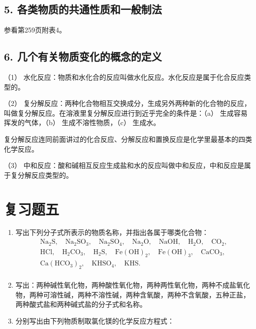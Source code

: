 \subsection{5. 各类物质的共通性质和一般制法}

参看第259页附表4。

\subsection{6. 几个有关物质变化的概念的定义}

（1）
水化反应：物质和水化合的反应叫做水化反应。水化反应是属于化合反应类型的。

（2）
复分解反应：两种化合物相互交换成分，生成另外两种新的化合物的反应，叫做复分解反应。在溶液里复分解反应进行到近乎完全的条件是：（a）
生成容易挥发的气体，（b） 生成不溶性物质，（c） 生成水。

复分解反应连同前面讲过的化合反应、分解反应和置换反应是化学里最基本的四类化学反应。

（3）
中和反应：酸和碱相互反应生成盐和水的反应叫做中和反应，中和反应是属于复分解反应类型的。

\section{复习题五}

\begin{enumerate}
\item
  写出下列分子式所表示的物质名称，并指出各属于哪类化合物：
\[
\begin{array}{l} \mathrm{Na}_{2} \mathrm{S}, \quad \mathrm{Na}_{2} \mathrm{SO}_{3}, \quad \mathrm{Na}_{2} \mathrm{SO}_{4}, \quad \mathrm{Na}_{2} \mathrm{O}, \quad \mathrm{NaOH}, \quad \mathrm{H}_{2} \mathrm{O}, \quad \mathrm{CO}_{2}, \\ \mathrm{HCl}, \quad \mathrm{H}_{2} \mathrm{CO}_{3}, \quad \mathrm{H}_{2} \mathrm{S}, \quad \mathrm{Fe(OH)}_{2}, \quad \mathrm{Fe(OH)}_{3}, \quad \mathrm{CaCO}_{3}, \\ \mathrm{Ca} (\mathrm{HCO}_{3}) _ {2}, \quad \mathrm{KHSO}_{4}, \quad \mathrm{KHS}. \\ \end{array}
\]
\item
  写出：两种碱性氧化物，两种酸性氧化物，两种两性氧化物，两种不成盐氧化物，两种可溶性碱，两种不溶性碱，两种含氧酸，两种不含氧酸，五种正盐，两种酸式盐和两种碱式盐的分子式和名称。
\item
  分别写出由下列物质制取氯化镁的化学反应方程式：
\end{enumerate}

